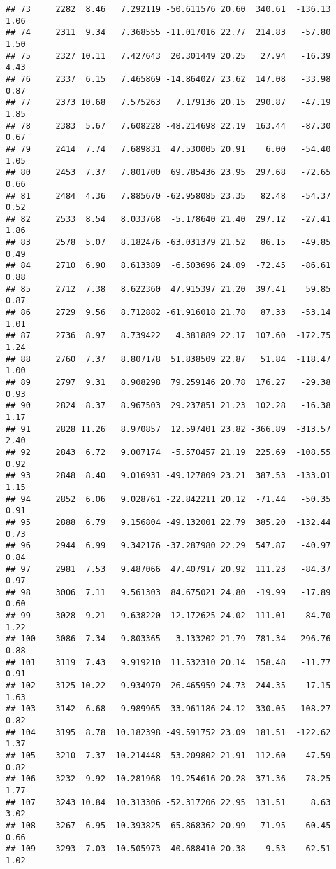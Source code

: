 \documentclass[]{article}
\begin{document}
\begin{verbatim}
## 73     2282  8.46   7.292119 -50.611576 20.60  340.61  -136.13  1.06
## 74     2311  9.34   7.368555 -11.017016 22.77  214.83   -57.80  1.50
## 75     2327 10.11   7.427643  20.301449 20.25   27.94   -16.39  4.43
## 76     2337  6.15   7.465869 -14.864027 23.62  147.08   -33.98  0.87
## 77     2373 10.68   7.575263   7.179136 20.15  290.87   -47.19  1.85
## 78     2383  5.67   7.608228 -48.214698 22.19  163.44   -87.30  0.67
## 79     2414  7.74   7.689831  47.530005 20.91    6.00   -54.40  1.05
## 80     2453  7.37   7.801700  69.785436 23.95  297.68   -72.65  0.66
## 81     2484  4.36   7.885670 -62.958085 23.35   82.48   -54.37  0.52
## 82     2533  8.54   8.033768  -5.178640 21.40  297.12   -27.41  1.86
## 83     2578  5.07   8.182476 -63.031379 21.52   86.15   -49.85  0.49
## 84     2710  6.90   8.613389  -6.503696 24.09  -72.45   -86.61  0.88
## 85     2712  7.38   8.622360  47.915397 21.20  397.41    59.85  0.87
## 86     2729  9.56   8.712882 -61.916018 21.78   87.33   -53.14  1.01
## 87     2736  8.97   8.739422   4.381889 22.17  107.60  -172.75  1.24
## 88     2760  7.37   8.807178  51.838509 22.87   51.84  -118.47  1.00
## 89     2797  9.31   8.908298  79.259146 20.78  176.27   -29.38  0.93
## 90     2824  8.37   8.967503  29.237851 21.23  102.28   -16.38  1.17
## 91     2828 11.26   8.970857  12.597401 23.82 -366.89  -313.57  2.40
## 92     2843  6.72   9.007174  -5.570457 21.19  225.69  -108.55  0.92
## 93     2848  8.40   9.016931 -49.127809 23.21  387.53  -133.01  1.15
## 94     2852  6.06   9.028761 -22.842211 20.12  -71.44   -50.35  0.91
## 95     2888  6.79   9.156804 -49.132001 22.79  385.20  -132.44  0.73
## 96     2944  6.99   9.342176 -37.287980 22.29  547.87   -40.97  0.84
## 97     2981  7.53   9.487066  47.407917 20.92  111.23   -84.37  0.97
## 98     3006  7.11   9.561303  84.675021 24.80  -19.99   -17.89  0.60
## 99     3028  9.21   9.638220 -12.172625 24.02  111.01    84.70  1.22
## 100    3086  7.34   9.803365   3.133202 21.79  781.34   296.76  0.88
## 101    3119  7.43   9.919210  11.532310 20.14  158.48   -11.77  0.91
## 102    3125 10.22   9.934979 -26.465959 24.73  244.35   -17.15  1.63
## 103    3142  6.68   9.989965 -33.961186 24.12  330.05  -108.27  0.82
## 104    3195  8.78  10.182398 -49.591752 23.09  181.51  -122.62  1.37
## 105    3210  7.37  10.214448 -53.209802 21.91  112.60   -47.59  0.82
## 106    3232  9.92  10.281968  19.254616 20.28  371.36   -78.25  1.77
## 107    3243 10.84  10.313306 -52.317206 22.95  131.51     8.63  3.02
## 108    3267  6.95  10.393825  65.868362 20.99   71.95   -60.45  0.66
## 109    3293  7.03  10.505973  40.688410 20.38   -9.53   -62.51  1.02

\end{verbatim}
\end{document}
